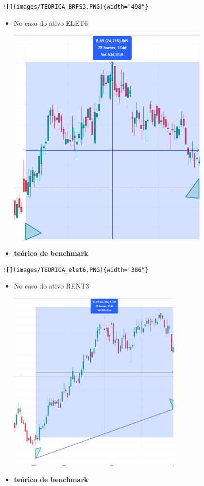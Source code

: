 \documentclass[
  letterpaper,
  DIV=11,
  numbers=noendperiod]{scrartcl}
\begin{document}
\begin{verbatim}
![](images/TEORICA_BRFS3.PNG){width="498"}
\end{verbatim}

\begin{itemize}
\item
  No caso do ativo ELET6

  \includegraphics[width=3.98958in,height=\textheight,keepaspectratio]{images/BHA_ELE6-01.PNG}
\item
  \textbf{teórico de benchmark}
\end{itemize}

\begin{verbatim}
![](images/TEORICA_elet6.PNG){width="386"}
\end{verbatim}

\begin{itemize}
\item
  No caso do ativo RENT3

  \includegraphics[width=3.42708in,height=\textheight,keepaspectratio]{images/BAH_RENT3.PNG}
\item
  \textbf{teórico de benchmark}
\end{itemize}
\end{document}
